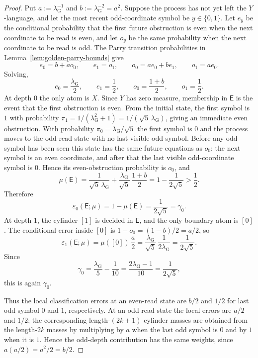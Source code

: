\documentclass{etds}%
\numberwithin{equation}{section}
\theoremstyle{plain}
\theoremstyle{definition}
\theoremstyle{remark}
\begin{document}
\begin{proof}
Put $a:=\lambda_{\mathrm G}^{-1}$ and $b:=\lambda_{\mathrm G}^{-2}=a^2$.  Suppose the process has not
yet left the $Y$-language, and let the most recent odd-coordinate symbol be
$y\in\{0,1\}$.  Let $e_y$ be the conditional probability that the first future
obstruction is even when the next coordinate to be read is even, and let $o_y$
be the same probability when the next coordinate to be read is odd.  The Parry
transition probabilities in Lemma~\ref{lem:golden-parry-bounds} give
\[
e_0=b+ao_0,\qquad e_1=o_1,\qquad
o_0=ae_0+be_1,\qquad o_1=ae_0.
\]
Solving,
\[
e_0=\frac{\lambda_{\mathrm G}}{2},\qquad e_1=\frac12,\qquad
o_0=\frac{1+b}{2},\qquad o_1=\frac12.
\]
At depth $0$ the only atom is $X$.  Since $Y$ has zero measure, membership in
$\mathsf E$ is the event that the first obstruction is even.  From the initial
state, the first symbol is $1$ with probability
$\pi_1=1/(\lambda_{\mathrm G}^2+1)=1/(\sqrt5\,\lambda_{\mathrm G})$, giving an
immediate even obstruction.  With probability
$\pi_0=\lambda_{\mathrm G}/\sqrt5$ the first symbol is $0$ and the process moves
to the odd-read state with no last visible odd symbol.  Before any odd symbol
has been seen this state has the same future equations as $o_0$: the next
symbol is an even coordinate, and after that the last visible odd-coordinate
symbol is $0$.  Hence its even-obstruction probability is $o_0$, and
\[
\mu(\mathsf E)
=\frac1{\sqrt5\,\lambda_{\mathrm G}}
+\frac{\lambda_{\mathrm G}}{\sqrt5}\,\frac{1+b}{2}
=1-\frac1{2\sqrt5}>\frac12.
\]
Therefore
\[
\varepsilon_0(\mathsf E;\mu)=1-\mu(\mathsf E)
=\frac1{2\sqrt5}
=\gamma_0.
\]
At depth $1$, the cylinder $[1]$ is decided in $\mathsf E$, and the only
boundary atom is $[0]$.  The conditional error inside $[0]$ is
$1-o_0=(1-b)/2=a/2$, so
\[
\varepsilon_1(\mathsf E;\mu)
=\mu([0])\,\frac a2
=\frac{\lambda_{\mathrm G}}{\sqrt5}\,\frac1{2\lambda_{\mathrm G}}
=\frac1{2\sqrt5}.
\]
Since
\[
\gamma_0=\frac{\lambda_{\mathrm G}}5-\frac1{10}
=\frac{2\lambda_{\mathrm G}-1}{10}
=\frac1{2\sqrt5},
\]
this is again $\gamma_0$.

Thus the local classification errors at an even-read state are $b/2$ and
$1/2$ for last odd symbol $0$ and $1$, respectively.  At an odd-read state the
local errors are $a/2$ and $1/2$; the corresponding length-$(2k+1)$ cylinder
masses are obtained from the length-$2k$ masses by multiplying by $a$ when the
last odd symbol is $0$ and by $1$ when it is $1$.  Hence the odd-depth
contribution has the same weights, since $a(a/2)=a^2/2=b/2$.


\end{proof}
\end{document}
